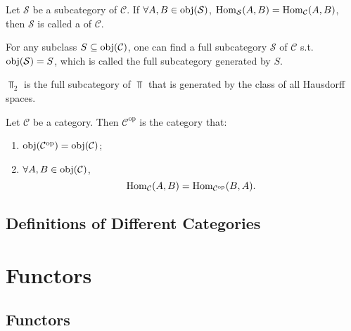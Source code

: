 \documentclass[openany, a5paper]{book}
\begin{document}
\begin{definition}
	Let $\mathcal S$ be a subcategory of $\mathcal C$.
	If $\forall A, B \in \operatorname{obj}(\mathcal S)$, 
	$\operatorname{Hom}_{\mathcal S}(A, B) = \operatorname{Hom}_{\mathcal C}(A, B)$, 
	then $\mathcal S$ is called a  of $\mathcal C$.
\end{definition}

\begin{definition}
	For any subclass $S \subseteq \operatorname{obj}(\mathcal C)$, 
	one can find a full subcategory $\mathcal S$ of $\mathcal C$ s.t.\ $\operatorname{obj}(\mathcal S) = S$, 
	which is called the full subcategory generated by $S$.
\end{definition}

$\Top_2$ is the full subcategory of $\Top$ that is generated by the class of all Hausdorff spaces.

\begin{definition}
	Let $\mathcal C$ be a category.
	Then $\mathcal C^\text{op}$ is the category that:
	\begin{enumerate}
		\item $\operatorname{obj}(\mathcal C^\text{op}) = \operatorname{obj}(\mathcal C)$;
		\item $\forall A, B \in \operatorname{obj}(\mathcal C)$, 
		\begin{equation}
			\operatorname{Hom}_{\mathcal C}(A, B) = \operatorname{Hom}_{\mathcal C^\text{op}}(B, A).
		\end{equation}
	\end{enumerate}
\end{definition}

\section{Definitions of Different Categories}

\chapter{Functors}
\section{Functors}
\end{document}
